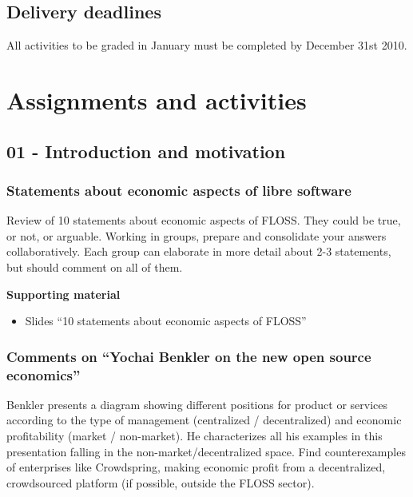 \documentclass[a4paper]{article}
\begin{document}
\subsection{Delivery deadlines}

All activities to be graded in January must be completed by December 31st 2010.

\section{Assignments and activities}

\subsection{01 - Introduction and motivation}


\subsubsection{Statements about economic aspects of libre software}
\label{sub:statements-eco}

Review of 10 statements about economic aspects of FLOSS. They could be true, or not, or arguable. Working in groups, prepare and consolidate your answers collaboratively. Each group can elaborate in more detail about 2-3 statements, but should comment on all of them.

\textbf{Supporting material}

\begin{itemize}
\item Slides ``10 statements about economic aspects of FLOSS''
\end{itemize}

\subsubsection{Comments on ``Yochai Benkler on the new open source economics''}
\label{sub:comments-benkler}

Benkler presents a diagram showing different positions for product or services according to the type of management (centralized / decentralized) and economic profitability (market / non-market). He characterizes all his examples in this presentation falling in the non-market/decentralized space. Find counterexamples of enterprises like Crowdspring, making economic profit from a decentralized, crowdsourced platform (if possible, outside the FLOSS sector).
\end{document}
